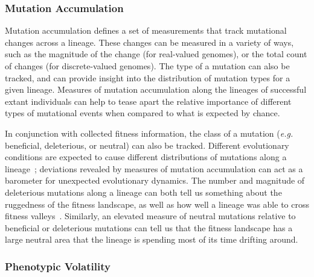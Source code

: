 \documentclass[letterpaper]{article}
\begin{document}
\subsubsection{Mutation Accumulation}
Mutation accumulation defines a set of measurements that track mutational changes across a lineage. These changes can be measured in a variety of ways, such as the magnitude of the change (for real-valued genomes), or the total count of changes (for discrete-valued genomes). The type of a mutation can also be tracked, and can provide insight into the distribution of mutation types for a given lineage. Measures of mutation accumulation along the lineages of successful extant individuals can help to tease apart the relative importance of different types of mutational events when compared to what is expected by chance. 

In conjunction with collected fitness information, the class of a mutation (\textit{e.g.} beneficial, deleterious, or neutral) can also be tracked. Different evolutionary conditions are expected to cause different distributions of mutations along a lineage~\citep{barrick2013genome}; deviations revealed by measures of mutation accumulation can act as a barometer for unexpected evolutionary dynamics.  
The number and magnitude of deleterious mutations along a lineage can both tell us something about the ruggedness of the fitness landscape, as well as how well a lineage was able to cross fitness valleys~\citep{covert_experiments_2013}. 
Similarly, an elevated measure of neutral mutations relative to beneficial or deleterious mutations can tell us that the fitness landscape has a large neutral area that the lineage is spending most of its time drifting around. 




\subsubsection{Phenotypic Volatility}
\end{document}
